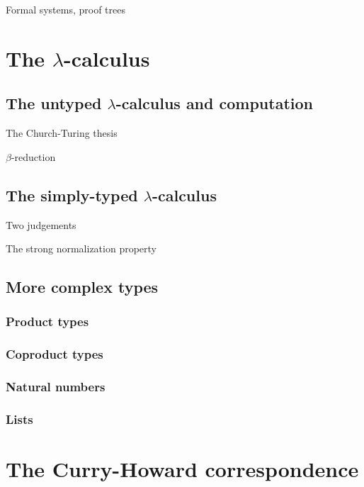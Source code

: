 \documentclass[12pt,twoside,draft]{reedthesis}
\begin{document}
Formal systems, proof trees

\section{The $\lambda$-calculus}
\label{sec:the-lambda-calculus}

\subsection{The untyped $\lambda$-calculus and computation}
\label{subsec:the-untyped-lambda-calculus}

The Church-Turing thesis

$\beta$-reduction

\subsection{The simply-typed $\lambda$-calculus}
\label{subsec:the-simply-typed-lambda-calculus}

Two judgements

The strong normalization property

\subsection{More complex types}
\label{subsec:more-complex-types}

\subsubsection{Product types}
\label{subsubsec:product-types}

\subsubsection{Coproduct types}
\label{subsubsec:coproduct-types}

\subsubsection{Natural numbers}
\label{subsubsec:natural-numbers}

\subsubsection{Lists}
\label{subsubsec:lists}

\section{The Curry-Howard correspondence}
\label{sec:the-curry-howard-correspondence}
\end{document}
